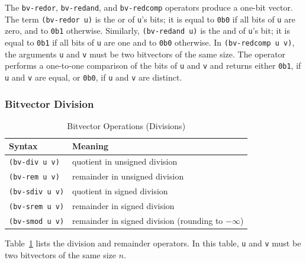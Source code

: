 \documentclass[11pt,twoside,fleqn,openright,titlepage]{cslreport}
\begin{document}
\medskip\noindent
The \texttt{bv-redor}, \texttt{bv-redand}, and \texttt{bv-redcomp}
operators produce a one-bit vector.  The term \texttt{(bv-redor u)} is
the or of \texttt{u}'s bits; it is equal to \texttt{0b0} if all bits
of \texttt{u} are zero, and to \texttt{0b1} otherwise. Similarly,
\texttt{(bv-redand u)} is the and of \texttt{u}'s bit; it is equal to
\texttt{0b1} if all bits of \texttt{u} are one and to \texttt{0b0}
otherwise. In \texttt{(bv-redcomp u v)}, the arguments \texttt{u} and
\texttt{v} must be two bitvectors of the same size. The operator
performs a one-to-one comparison of the bits of \texttt{u} and
\texttt{v} and returns either \texttt{0b1}, if \texttt{u} and
\texttt{v} are equal, or \texttt{0b0}, if \texttt{u} and \texttt{v}
are distinct.

\subsubsection*{Bitvector Division}

\begin{table}
\begin{small}
\begin{center}
\begin{tabular}{|p{3.3cm}|l|}
\hline
Syntax & Meaning \\
\hline
\texttt{(bv-div u v)} & quotient in unsigned division \\
\texttt{(bv-rem u v)} & remainder in unsigned division \\
\hline
\texttt{(bv-sdiv u v)} & quotient in signed division \\
\texttt{(bv-srem u v)} & remainder in signed division \\
\hline
\texttt{(bv-smod u v)} & remainder in signed division (rounding to $-\infty$)\\
\hline
\end{tabular}
\end{center}
\end{small}
\caption{Bitvector Operations (Divisions)}
\label{bitvectors4}
\end{table}

Table~\ref{bitvectors4} lists the division and remainder operators. In
this table, \texttt{u} and \texttt{v} must be two bitvectors of the
same size $n$.
\end{document}
